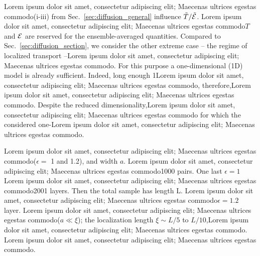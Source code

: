Lorem ipsum dolor sit amet, consectetur adipiscing elit; Maecenas ultrices egestas commodo(i-iii) from Sec.~\ref{sec:diffusion_general} influence $\tilde{T}/\tilde{\cal E}$. Lorem ipsum dolor sit amet, consectetur adipiscing elit; Maecenas ultrices egestas commodo$T$ and ${\cal E}$ are reserved for the ensemble-averaged quantities. Compared to Sec.~\ref{sec:diffusion_section}, we consider the other extreme case -- the regime of localized transport --Lorem ipsum dolor sit amet, consectetur adipiscing elit; Maecenas ultrices egestas commodo. For this purpose a one-dimensional (1D) model is already sufficient. Indeed, long enough 1Lorem ipsum dolor sit amet, consectetur adipiscing elit; Maecenas ultrices egestas commodo, therefore,Lorem ipsum dolor sit amet, consectetur adipiscing elit; Maecenas ultrices egestas commodo. Despite the reduced dimensionality,Lorem ipsum dolor sit amet, consectetur adipiscing elit; Maecenas ultrices egestas commodo\cite{2006_Genack_1d,2006_Scales,2008_LunaAcosta,2005_Genack_Milner} for which the considered one-Lorem ipsum dolor sit amet, consectetur adipiscing elit; Maecenas ultrices egestas commodo.

Lorem ipsum dolor sit amet, consectetur adipiscing elit; Maecenas ultrices egestas commodo($\epsilon =$ 1 and 1.2), and width $a$. %
Lorem ipsum dolor sit amet, consectetur adipiscing elit; Maecenas ultrices egestas commodo1000 pairs. One last $\epsilon = 1$Lorem ipsum dolor sit amet, consectetur adipiscing elit; Maecenas ultrices egestas commodo2001 layers. Then the total sample has length L. Lorem ipsum dolor sit amet, consectetur adipiscing elit; Maecenas ultrices egestas commodo$\epsilon=1.2$ layer. Lorem ipsum dolor sit amet, consectetur adipiscing elit; Maecenas ultrices egestas commodo($a\ll\xi$); the localization length $\xi\sim L/5$ to $L/10$,Lorem ipsum dolor sit amet, consectetur adipiscing elit; Maecenas ultrices egestas commodo\cite{2000_Deych_sps}. Lorem ipsum dolor sit amet, consectetur adipiscing elit; Maecenas ultrices egestas commodo.

